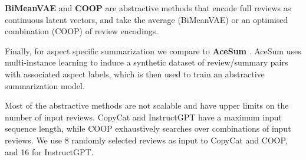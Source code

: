 \documentclass[11pt]{article}
\begin{document}
\textbf{BiMeanVAE} and \textbf{COOP} \cite{iso-etal-2021-convex-aggregation} are abstractive methods that encode full reviews as continuous latent vectors, and take the average (BiMeanVAE) or an optimised combination (COOP) of review encodings.

Finally, for aspect specific summarization we compare to \textbf{AceSum} \cite{amplayo-etal-2021-aspect}. AceSum uses multi-instance learning to induce a synthetic dataset of review/summary pairs with associated aspect labels, which is then used to train an abstractive summarization model.


Most of the abstractive methods are not scalable and have upper limits on the number of input reviews. CopyCat and InstructGPT have a maximum input sequence length, while COOP exhaustively searches over combinations of input reviews. We use 8 randomly selected reviews as input to CopyCat and COOP, and 16 for InstructGPT.


\end{document}
